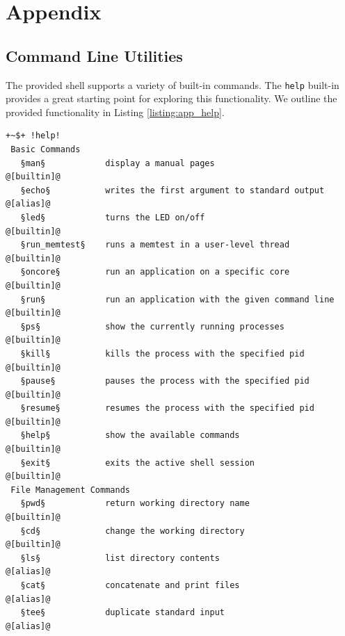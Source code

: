 \begingroup
\renewcommand\thechapter{A}
{\normalfont\huge\bfseries}{}{}{\Huge}
\chapter{Appendix}
\section{Command Line Utilities} \label{sec:appendix_user_guide}

The provided shell supports a variety of built-in commands. The \texttt{help} built-in provides a great starting point for exploring this functionality. We outline the provided functionality in Listing \ref{listing:app_help}.
\begin{lstlisting}[style=ShellInputStyle, deletekeywords={run, command, wc, echo, builtin, alias, return, in, ps, kill, help, exit, pwd, cd, cat, tee, time, false, true, test, set}, basicstyle=\tiny\ttfamily\color{shell_default}, label={listing:app_help}, caption={The \texttt{help} built-in provides a list of available commands}]
 +~$+ !help!
 Basic Commands
   §man§            display a manual pages                               @[builtin]@
   §echo§           writes the first argument to standard output         @[alias]@
   §led§            turns the LED on/off                                 @[builtin]@
   §run_memtest§    runs a memtest in a user-level thread                @[builtin]@
   §oncore§         run an application on a specific core                @[builtin]@
   §run§            run an application with the given command line       @[builtin]@
   §ps§             show the currently running processes                 @[builtin]@
   §kill§           kills the process with the specified pid             @[builtin]@
   §pause§          pauses the process with the specified pid            @[builtin]@
   §resume§         resumes the process with the specified pid           @[builtin]@
   §help§           show the available commands                          @[builtin]@
   §exit§           exits the active shell session                       @[builtin]@
 File Management Commands
   §pwd§            return working directory name                        @[builtin]@
   §cd§             change the working directory                         @[builtin]@
   §ls§             list directory contents                              @[alias]@
   §cat§            concatenate and print files                          @[alias]@
   §tee§            duplicate standard input                             @[alias]@

\end{lstlisting}
